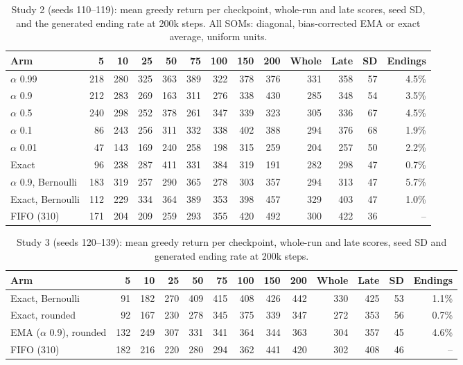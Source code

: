 \documentclass{article}
\begin{document}
\begin{table}[h]
\caption{Study 2 (seeds 110--119): mean greedy return per checkpoint,
whole-run and late scores, seed SD, and the generated ending rate at 200k
steps. All SOMs: diagonal, bias-corrected EMA or exact average, uniform
units.}
\label{tab:alpha-all}
\centering
\small
\begin{tabular}{lrrrrrrrrrrrr}
\toprule
Arm & 5 & 10 & 25 & 50 & 75 & 100 & 150 & 200 & Whole & Late & SD & Endings \\
\midrule
$\alpha$ 0.99 & 218 & 280 & 325 & 363 & 389 & 322 & 378 & 376 & 331 & 358 & 57 & 4.5\% \\
$\alpha$ 0.9 & 212 & 283 & 269 & 163 & 311 & 276 & 338 & 430 & 285 & 348 & 54 & 3.5\% \\
$\alpha$ 0.5 & 240 & 298 & 252 & 378 & 261 & 347 & 339 & 323 & 305 & 336 & 67 & 4.5\% \\
$\alpha$ 0.1 & 86 & 243 & 256 & 311 & 332 & 338 & 402 & 388 & 294 & 376 & 68 & 1.9\% \\
$\alpha$ 0.01 & 47 & 143 & 169 & 240 & 258 & 198 & 315 & 259 & 204 & 257 & 50 & 2.2\% \\
Exact & 96 & 238 & 287 & 411 & 331 & 384 & 319 & 191 & 282 & 298 & 47 & 0.7\% \\
$\alpha$ 0.9, Bernoulli & 183 & 319 & 257 & 290 & 365 & 278 & 303 & 357 & 294 & 313 & 47 & 5.7\% \\
Exact, Bernoulli & 112 & 229 & 334 & 364 & 389 & 353 & 398 & 457 & 329 & 403 & 47 & 1.0\% \\
FIFO (310) & 171 & 204 & 209 & 259 & 293 & 355 & 420 & 492 & 300 & 422 & 36 & -- \\
\bottomrule
\end{tabular}
\end{table}

\begin{table}[h]
\caption{Study 3 (seeds 120--139): mean greedy return per checkpoint,
whole-run and late scores, seed SD and generated ending rate at 200k steps.}
\label{tab:repl-all}
\centering
\small
\begin{tabular}{lrrrrrrrrrrrr}
\toprule
Arm & 5 & 10 & 25 & 50 & 75 & 100 & 150 & 200 & Whole & Late & SD & Endings \\
\midrule
Exact, Bernoulli & 91 & 182 & 270 & 409 & 415 & 408 & 426 & 442 & 330 & 425 & 53 & 1.1\% \\
Exact, rounded & 92 & 167 & 230 & 278 & 345 & 375 & 339 & 347 & 272 & 353 & 56 & 0.7\% \\
EMA ($\alpha$ 0.9), rounded & 132 & 249 & 307 & 331 & 341 & 364 & 344 & 363 & 304 & 357 & 45 & 4.6\% \\
FIFO (310) & 182 & 216 & 220 & 280 & 294 & 362 & 441 & 420 & 302 & 408 & 46 & -- \\
\bottomrule
\end{tabular}
\end{table}
\end{document}
